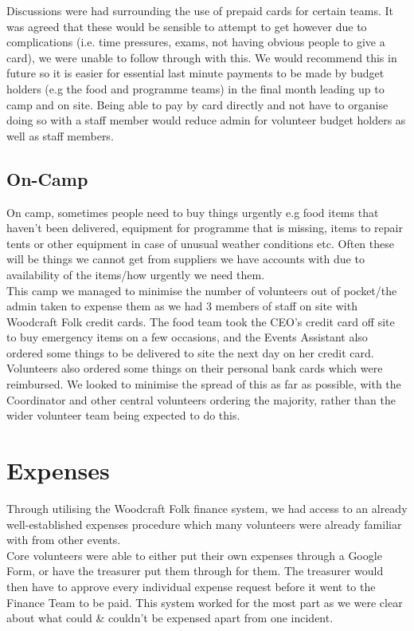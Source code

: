 Discussions were had surrounding the use of prepaid cards for certain teams. It was agreed that these would be sensible to attempt to get however due to complications (i.e. time pressures, exams, not having obvious people to give a card), we were unable to follow through with this. We would recommend this in future so it is easier for essential last minute payments to be made by budget holders (e.g the food and programme teams) in the final month leading up to camp and on site. Being able to pay by card directly and not have to organise doing so with a staff member would reduce admin for volunteer budget holders as well as staff members.

\subsection{On-Camp}
On camp, sometimes people need to buy things urgently e.g food items that haven't been delivered, equipment for programme that is missing, items to repair tents or other equipment in case of unusual weather conditions etc. Often these will be things we cannot get from suppliers we have accounts with due to availability of the items/how urgently we need them.\\

This camp we managed to minimise the number of volunteers out of pocket/the admin taken to expense them as we had 3 members of staff on site with Woodcraft Folk credit cards. The food team took the CEO's credit card off site to buy emergency items on a few occasions, and the Events Assistant also ordered some things to be delivered to site the next day on her credit card.\\

Volunteers also ordered some things on their personal bank cards which were reimbursed. We looked to minimise the spread of this as far as possible, with the Coordinator and other central volunteers ordering the majority, rather than the wider volunteer team being expected to do this.

\section{Expenses}
Through utilising the Woodcraft Folk finance system, we had access to an already well-established expenses procedure which many volunteers were already familiar with from other events.\\

Core volunteers were able to either put their own expenses through a Google Form, or have the treasurer put them through for them. The treasurer would then have to approve every individual expense request before it went to the Finance Team to be paid. This system worked for the most part as we were clear about what could \& couldn't be expensed apart from one incident.\\

